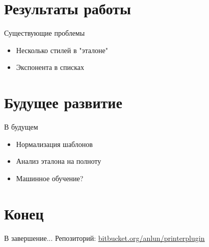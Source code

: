 \documentclass[sans]{beamer}
\begin{document}
\section{Результаты работы}

\begin{frame}{Существующие проблемы}
	\begin{itemize}
		\item Несколько стилей в "эталоне"
		\item Экспонента в списках
	\end{itemize}
\end{frame}

\section{Будущее развитие}

\begin{frame}{В будущем}
	\begin{itemize}
		\item Нормализация шаблонов
		\item Анализ эталона на полноту
		\item Машинное обучение?
	\end{itemize}
\end{frame}

\section{Конец}

\begin{frame}{В завершение...}
	Репозиторий: \color{blue} \underline{\url{bitbucket.org/anlun/printerplugin}}
\end{frame}
\end{document}
